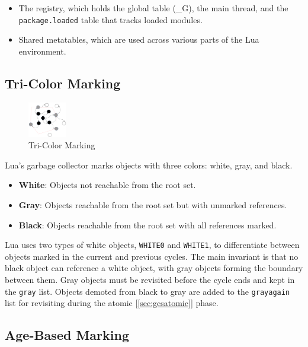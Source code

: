 \documentclass[10pt]{article}
\begin{document}
\begin{itemize}
    \item The registry, which holds the global table (\_G), the main thread, and the \texttt{package.loaded} table that tracks loaded modules.
    \item Shared metatables, which are used across various parts of the Lua environment.
\end{itemize}

\subsection{Tri-Color Marking} \label{sec:tri_color_marking}

\begin{figure}
  \centering
  \includegraphics[width=0.15\textwidth]{WGB.png}
  \caption{Tri-Color Marking}
  \label{fig:tri-color-marking}
\end{figure}

Lua's garbage collector marks objects with three colors: white, gray, and black.

\begin{itemize}
  \item \textbf{White}: Objects not reachable from the root set.
  \item \textbf{Gray}: Objects reachable from the root set but with unmarked references.
  \item \textbf{Black}: Objects reachable from the root set with all references marked.
\end{itemize}

Lua uses two types of white objects, \texttt{WHITE0} and \texttt{WHITE1}, to differentiate between objects marked in the current and previous cycles. The main invariant is that no black object can reference a white object, with gray objects forming the boundary between them. Gray objects must be revisited before the cycle ends and kept in the \texttt{gray} list. Objects demoted from black to gray are added to the \texttt{grayagain} list for revisiting during the atomic [\ref{sec:gcsatomic}] phase.

\subsection{Age-Based Marking} \label{sec:age_based_marking}
\end{document}
